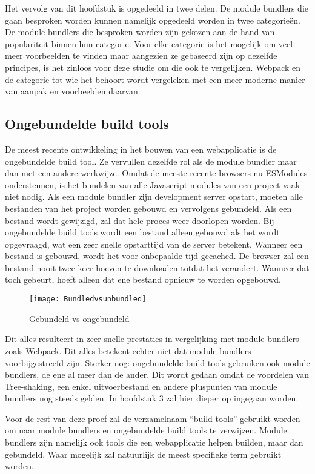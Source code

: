 Het vervolg van dit hoofdstuk is opgedeeld in twee delen. De module bundlers die gaan besproken worden kunnen namelijk opgedeeld worden in twee categorieën. De module bundlers die besproken worden zijn gekozen aan de hand van populariteit \autocite{stateofjs-2020} binnen hun categorie. Voor elke categorie is het mogelijk om veel meer voorbeelden te vinden maar aangezien ze gebaseerd zijn op dezelfde principes, is het zinloos voor deze studie om die ook te vergelijken. Webpack en de categorie tot wie het behoort wordt vergeleken met een meer moderne manier van aanpak en voorbeelden daarvan.

\subsection{Ongebundelde build tools}
De meest recente ontwikkeling in het bouwen van een webapplicatie is de ongebundelde build tool. Ze vervullen dezelfde rol als de module bundler maar dan met een andere werkwijze. Omdat de meeste recente browsers nu ESModules ondersteunen, is het bundelen van alle Javascript modules van een project vaak niet nodig. Als een module bundler zijn development server opstart, moeten alle bestanden van het project worden gebouwd en vervolgens gebundeld. Als een bestand wordt gewijzigd, zal dat hele proces weer doorlopen worden. Bij ongebundelde build tools wordt een bestand alleen gebouwd als het wordt opgevraagd, wat een zeer snelle opstarttijd van de server betekent. Wanneer een bestand is gebouwd, wordt het voor onbepaalde tijd gecached. De browser zal een bestand nooit twee keer hoeven te downloaden totdat het verandert. Wanneer dat toch gebeurt, hoeft alleen dat ene bestand opnieuw te worden opgebouwd. 

\begin{figure}[h]
\texttt{[image: Bundledvsunbundled]}
   \caption{Gebundeld vs ongebundeld \autocite{snowpack-no-date}}
\end{figure}

Dit alles resulteert in zeer snelle prestaties in vergelijking met module bundlers zoals Webpack. Dit alles betekent echter niet dat module bundlers voorbijgestreefd zijn. Sterker nog: ongebundelde build tools gebruiken ook module bundlers, de ene al meer dan de ander. Dit wordt gedaan omdat de voordelen van Tree-shaking, een enkel uitvoerbestand en andere pluspunten van module bundlers nog steeds gelden. In hoofdstuk 3 zal hier dieper op ingegaan worden.

Voor de rest van deze proef zal de verzamelnaam “build tools” gebruikt worden om naar module bundlers en ongebundelde build tools te verwijzen. Module bundlers zijn namelijk ook tools die een webapplicatie helpen builden, maar dan gebundeld. Waar mogelijk zal natuurlijk de meest specifieke term gebruikt worden.


